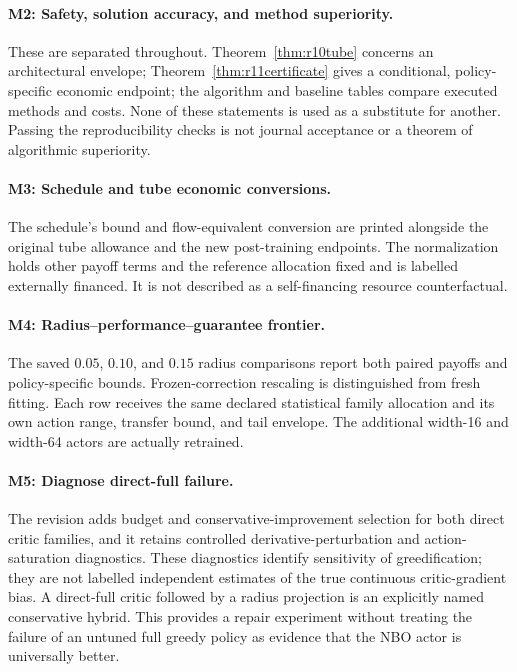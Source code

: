 \paragraph{M2: Safety, solution accuracy, and method superiority.}
These are separated throughout. Theorem~\ref{thm:r10tube} concerns an architectural envelope; Theorem~\ref{thm:r11certificate} gives a conditional, policy-specific economic endpoint; the algorithm and baseline tables compare executed methods and costs. None of these statements is used as a substitute for another. Passing the reproducibility checks is not journal acceptance or a theorem of algorithmic superiority.

\paragraph{M3: Schedule and tube economic conversions.}
The schedule's bound and flow-equivalent conversion are printed alongside the original tube allowance and the new post-training endpoints. The normalization holds other payoff terms and the reference allocation fixed and is labelled externally financed. It is not described as a self-financing resource counterfactual.

\paragraph{M4: Radius--performance--guarantee frontier.}
The saved $0.05$, $0.10$, and $0.15$ radius comparisons report both paired payoffs and policy-specific bounds. Frozen-correction rescaling is distinguished from fresh fitting. Each row receives the same declared statistical family allocation and its own action range, transfer bound, and tail envelope. The additional width-16 and width-64 actors are actually retrained.

\paragraph{M5: Diagnose direct-full failure.}
The revision adds budget and conservative-improvement selection for both direct critic families, and it retains controlled derivative-perturbation and action-saturation diagnostics. These diagnostics identify sensitivity of greedification; they are not labelled independent estimates of the true continuous critic-gradient bias. A direct-full critic followed by a radius projection is an explicitly named conservative hybrid. This provides a repair experiment without treating the failure of an untuned full greedy policy as evidence that the NBO actor is universally better.

